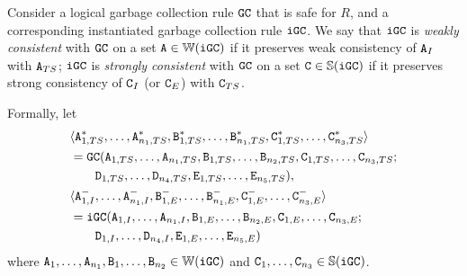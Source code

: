 \begin{property}\label{property:instantiated_gc_consistent}
Consider a logical garbage collection rule $\tt{GC}$ that is safe for $R$, and a corresponding instantiated garbage collection rule $\tt{iGC}$.
We say that
$\tt{iGC}$ is \emph{weakly consistent}   with $\tt{GC}$ on a set $\tt{A} \in \mathbb{W}(\tt{iGC})$ if it preserves weak consistency   of $\tt{A}_I$                 with $\tt{A}_{TS}$;
$\tt{iGC}$ is \emph{strongly consistent} with $\tt{GC}$ on a set $\tt{C} \in \mathbb{S}(\tt{iGC})$ if it preserves strong consistency of $\tt{C}_I$ (or $\tt{C}_E$) with $\tt{C}_{TS}$.

Formally, let
\begin{align*}
&\langle
\tt{A}_{1,TS}^*, \dots, \tt{A}_{n_1,TS}^*,
\tt{B}_{1,TS}^*, \dots, \tt{B}_{n_1,TS}^*, 
\tt{C}_{1,TS}^*, \dots, \tt{C}_{n_3,TS}^*
\rangle \\
&= \tt{GC}(
\tt{A}_{1,TS}, \dots, \tt{A}_{n_1,TS},
\tt{B}_{1,TS}, \dots, \tt{B}_{n_2,TS},
\tt{C}_{1,TS}, \dots, \tt{C}_{n_3,TS};
\\&\qquad
\tt{D}_{1,TS}, \dots, \tt{D}_{n_4,TS},
\tt{E}_{1,TS}, \dots, \tt{E}_{n_5,TS}
),\\
&\langle
\tt{A}_{1,I}^-, \dots, \tt{A}_{n_1,I}^-,
\tt{B}_{1,E}^-, \dots, \tt{B}_{n_1,E}^-,
\tt{C}_{1,E}^-, \dots, \tt{C}_{n_3,E}^-
\rangle\\
&= \tt{iGC}(
\tt{A}_{1,I}, \dots, \tt{A}_{n_1,I},
\tt{B}_{1,E}, \dots, \tt{B}_{n_2,E},
\tt{C}_{1,E}, \dots, \tt{C}_{n_3,E};
\\&\qquad
\tt{D}_{1,I}, \dots, \tt{D}_{n_4,I},
\tt{E}_{1,E}, \dots, \tt{E}_{n_5,E}
)
\end{align*}
where $\tt{A}_1, \dots, \tt{A}_{n_1}, \tt{B}_1, \dots, \tt{B}_{n_2} \in \mathbb{W}(\tt{iGC})$ and $\tt{C}_1, \dots, \tt{C}_{n_3} \in \mathbb{S}(\tt{iGC})$.


\end{property}
